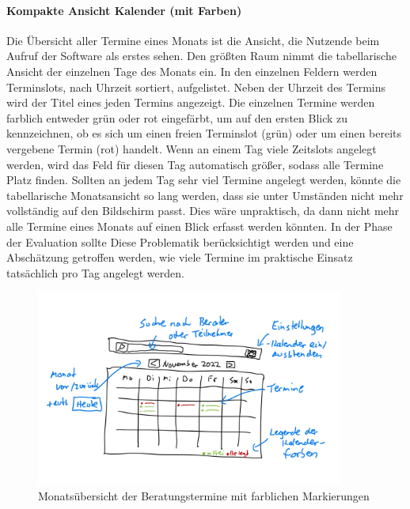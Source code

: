 \documentclass[12pt]{article}
\begin{document}
\paragraph{Kompakte Ansicht Kalender (mit Farben)}

Die Übersicht aller Termine eines Monats ist die Ansicht, die Nutzende beim
Aufruf der Software als erstes sehen. Den größten Raum nimmt die tabellarische
Ansicht der einzelnen Tage des Monats ein. In den einzelnen Feldern werden
Terminslots, nach Uhrzeit sortiert, aufgelistet. Neben der Uhrzeit des Termins
wird der Titel eines jeden Termins angezeigt. Die einzelnen Termine werden
farblich entweder grün oder rot eingefärbt, um auf den ersten Blick zu
kennzeichnen, ob es sich um einen freien Terminslot (grün) oder um einen
bereits vergebene Termin (rot) handelt. Wenn an einem Tag viele Zeitslots
angelegt werden, wird das Feld für diesen Tag automatisch größer, sodass alle
Termine Platz finden. Sollten an jedem Tag sehr viel Termine angelegt werden,
könnte die tabellarische Monatsansicht so lang werden, dass sie unter Umständen
nicht mehr vollständig auf den Bildschirm passt. Dies wäre unpraktisch, da dann
nicht mehr alle Termine eines Monats auf einen Blick erfasst werden könnten. In
der Phase der Evaluation sollte Diese Problematik berücksichtigt werden und
eine Abschätzung getroffen werden, wie viele Termine im praktische Einsatz
tatsächlich pro Tag angelegt werden.

\begin{figure}[h]
    \caption{Monatsübersicht der Beratungstermine mit farblichen Markierungen}
    \centering
    \includegraphics[width=0.9\textwidth]{doodle_month_view.jpeg}
\end{figure}
\end{document}
